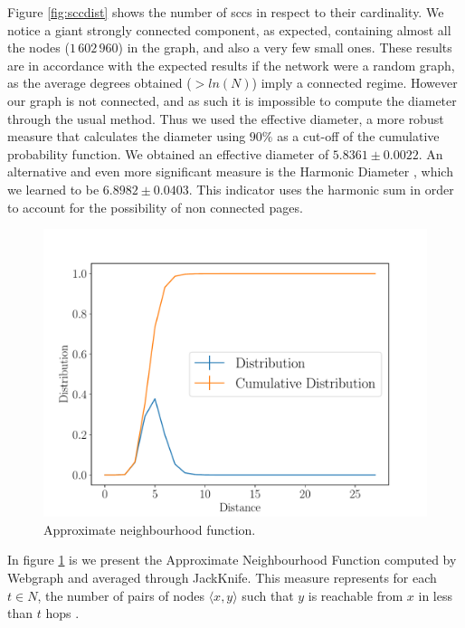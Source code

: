 \documentclass[9pt,a4paper,twocolumn]{article}
\begin{document}
Figure \ref{fig:sccdist} shows the number of \acrshort{scc}s in respect to their cardinality. We notice a giant strongly connected component, as expected, containing almost all the nodes ($1\,602\,960$) in the graph, and also a very few small ones. These results are in accordance with the expected results if the network were a random graph, as the average degrees obtained ($> ln(N)$) imply a connected regime. However our graph is not connected, and as such it is impossible to compute the diameter through the usual method. Thus we used the effective diameter, a more robust measure that calculates the diameter using $90\%$ as a cut-off of the cumulative probability function. We obtained an effective diameter of $5.8361 \pm 0.0022$. An alternative and even more significant measure is the Harmonic Diameter \cite{fogaras}, which we learned to be $6.8982 \pm 0.0403$. This indicator uses the harmonic sum in order to account for the possibility of non connected pages.

\begin{figure}[h]
	\centering
	\includegraphics[width=\linewidth]{wikipedia_pt_neighbourhood_function.pdf}
	\caption{Approximate neighbourhood function.}
	\label{fig:neighfun}
\end{figure}

In figure \ref{fig:neighfun} is we present the Approximate Neighbourhood Function computed by Webgraph and averaged through JackKnife. This measure represents for each $t \in N$, the number of pairs of nodes $ \langle x, y \rangle $ such that $y$ is reachable from $x$ in less than $t$ hops \cite{Boldi2011HyperANFAT}.
\end{document}
